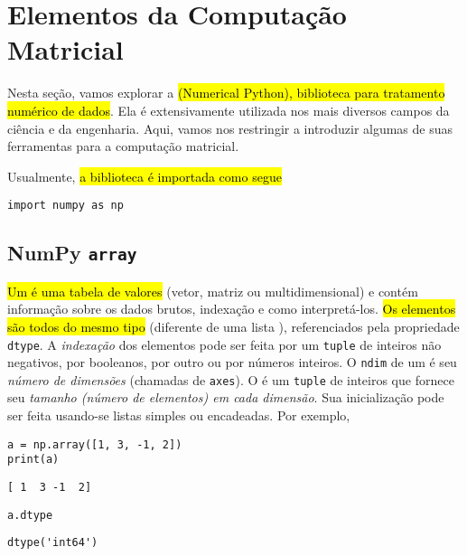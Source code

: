 

\section{Elementos da Computação Matricial}\label{sec_matricial}

Nesta seção, vamos explorar a \hl{{\numpy} (Numerical Python), biblioteca para tratamento numérico de dados}. Ela é extensivamente utilizada nos mais diversos campos da ciência e da engenharia. Aqui, vamos nos restringir a introduzir algumas de suas ferramentas para a computação matricial.

Usualmente, \hl{a biblioteca é importada como segue}

\begin{lstlisting}
import numpy as np
\end{lstlisting}

\subsection{NumPy \texttt{array}}

\hl{Um {\PYTHONnumpyDOTarray} é uma tabela de valores} (vetor, matriz ou multidimensional) e contém informação sobre os dados brutos, indexação e como interpretá-los. \hl{Os elementos são todos do mesmo tipo} (diferente de uma lista {\python}), referenciados pela propriedade \texttt{dtype}. A \emph{indexação} dos elementos pode ser feita por um \texttt{tuple} de inteiros não negativos, por booleanos, por outro {\PYTHONnumpyDOTarray} ou por números inteiros. O \texttt{ndim} de um {\PYTHONnumpyDOTarray} é seu \emph{número de dimensões} (chamadas de \texttt{axes}). O {\PYTHONnumpyDOTndarrayDOTshape} é um \texttt{tuple} de inteiros que fornece seu \emph{tamanho (número de elementos) em cada dimensão}. Sua inicialização pode ser feita usando-se listas simples ou encadeadas. Por exemplo,

\begin{lstlisting}
a = np.array([1, 3, -1, 2])
print(a)
\end{lstlisting}

\begin{verbatim}
[ 1  3 -1  2]
\end{verbatim}

\begin{lstlisting}
a.dtype
\end{lstlisting}

\begin{verbatim}
dtype('int64')
\end{verbatim}


